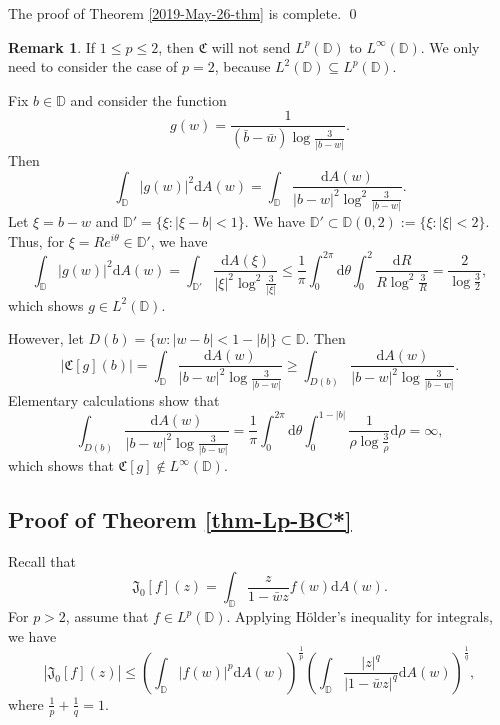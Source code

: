 \documentclass[a4paper,12pt]{amsart}
\theoremstyle{definition}
\newtheorem{rem}{Remark}[section]%
\numberwithin{equation}{section}
\newcommand{\ID}{{\mathbb D}}
\def\be{\begin{equation}}
\def\ee{\end{equation}}
\begin{document}
The proof of Theorem \ref{2019-May-26-thm} is complete. \qed
\begin{rem}\label{rem1}
If $1\leq p\leq2$, then $\mathfrak{C}$ will not send $L^p(\ID)$ to $L^{\infty}(\ID)$.
We only need to consider the case of $p=2$, because $L^2(\ID)\subseteq L^p(\ID)$.

Fix $b\in\ID$ and consider the function
$$g(w)=\frac{1}{(\bar{b}-\bar{w})\log\frac{3}{|b-w|}}.$$
Then
$$\int_{\ID}|g(w)|^2\mathrm{d}A(w) =\int_{\ID}\frac{\mathrm{d}A(w) }{|b-w|^2\log^2\frac{3}{|b-w|}}.$$
Let $\xi=b-w$ and $\ID'=\{\xi: |\xi-b|<1\}$. We have $\ID'\subset\ID(0, 2):=\{\xi: |\xi|<2\}$. Thus, for $\xi=R e^{i\theta}\in\ID'$, we have
$$\int_{\ID}|g(w)|^2\mathrm{d}A(w) =\int_{\ID'}\frac{\mathrm{d}A(\xi)}{|\xi|^2\log^2\frac{3}{|\xi|}}\leq\frac{1}{\pi}\int_0^{2\pi}\mathrm{d}\theta\int_0^2\frac{\mathrm{d}R}{R\log^2\frac{3}{R}}=\frac{2}{\log\frac{3}{2}},$$
which shows $g\in L^2(\ID)$.

However, let $D(b)=\{w:|w-b|<1-|b|\}\subset\ID$. Then
$$|\mathfrak{C}[g](b)|=\int_{\ID}\frac{\mathrm{d}A(w) }{|b-w|^2\log\frac{3}{|b-w|}}\geq\int_{D(b)}\frac{\mathrm{d}A(w) }{|b-w|^2\log\frac{3}{|b-w|}}.$$
Elementary calculations show that
$$\int_{D(b)}\frac{\mathrm{d}A(w) }{|b-w|^2\log\frac{3}{|b-w|}}=\frac{1}{\pi}\int_0^{2\pi}\mathrm{d}\theta\int_0^{1-|b|}\frac{1}{\rho\log \frac{3}{\rho}}\mathrm{d}\rho=\infty,$$
which shows that $\mathfrak{C}[g]\notin L^{\infty}(\ID)$.
\end{rem}
\subsection*{Proof of Theorem \ref{thm-Lp-BC*}}
Recall that
$$\mathfrak{J}_0[f](z)=\int_{\ID}\frac{{z}}{1-\bar{w}z}f(w)\mathrm{d}A(w) .$$
For $p>2$, assume that $f\in L^p(\ID)$. Applying H\"older's inequality for integrals, we have
\be\label{June-229-1}|\mathfrak{J}_0[f](z)|\leq\left(\int_{\ID}|f(w)|^p\mathrm{d}A(w) \right)^{\frac{1}{p}}\left(\int_{\ID}\frac{|z|^q}{|1-\bar{w}z|^q}\mathrm{d}A(w) \right)^{\frac{1}{q}},\ee
where $\frac{1}{p}+\frac{1}{q}=1$.
\end{document}

